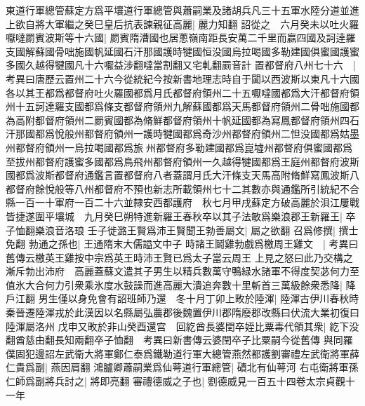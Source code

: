 東道行軍總管蘇定方爲平壤道行軍總管與蕭嗣業及諸胡兵凡三十五軍水陸分道並進上欲自將大軍繼之癸巳皇后抗表諫親征高麗|{
	麗力知翻}
詔從之　六月癸未以吐火羅嚈噠罽賓波斯等十六國|{
	罽賓隋漕國也居蔥嶺南距長安萬二千里而嬴四國及訶逹羅支國解蘇國骨咄施國帆延國石汗那國護時犍國恒没國烏拉喝國多勒建國俱蜜國護蜜多國久越得犍國凡十六嚈益涉翻噠當割翻又宅軋翻罽音計}
置都督府八州七十六　|{
	考異曰唐歷云置州二十六今從統紀今按新書地理志時自于闐以西波斯以東凡十六國各以其王都爲都督府吐火羅國都爲月氏都督府領州二十五嚈噠國都爲大汗都督府領州十五訶達羅支國都爲條支都督府領州九解蘇國都爲天馬都督府領州二骨咄施國都為高附都督府領州二罽賓國都為脩鮮都督府領州十帆延國都為寫鳳都督府領州四石汗那國都爲悅般州都督府領州一護時犍國都爲奇沙州都督府領州二怛没國都爲姑墨州都督府領州一烏拉喝國都爲旅州都督府多勒建國都爲崑墟州都督府俱蜜國都爲至拔州都督府護蜜多國都爲鳥飛州都督府領州一久越得犍國都爲王庭州都督府波斯國都爲波斯都督府通鑑言置都督府八者蓋謂月氏大汗條支天馬高附脩鮮寫鳳波斯八都督府餘悅般等八州都督府不預也新志所載領州七十二其數亦與通鑑所引統紀不合}
縣一百一十軍府一百二十六並隸安西都護府　秋七月甲戌蘇定方破高麗於浿江屢戰皆捷遂圍平壤城　九月癸巳朔特進新羅王春秋卒以其子法敏爲樂浪郡王新羅王|{
	卒子恤翻樂浪音洛琅}
壬子徙潞王賢爲沛王賢聞王勃善屬文|{
	屬之欲翻}
召爲修撰|{
	撰士免翻}
勃通之孫也|{
	王通隋末大儒謚文中子}
時諸王鬬雞勃戲爲檄周王雞文　|{
	考異曰舊傳云檄英王雞按中宗爲英王時沛王賢已爲太子當云周王}
上見之怒曰此乃交構之漸斥勃出沛府　高麗蓋蘇文遣其子男生以精兵數萬守鴨緑水諸軍不得度契苾何力至值氷大合何力引衆乘氷度水鼓譟而進高麗大潰追奔數十里斬首三萬級餘衆悉降|{
	降戶江翻}
男生僅以身免會有詔班師乃還　冬十月丁卯上畋於陸渾|{
	陸渾古伊川春秋時秦晉遷陸渾戎於此漢因以名縣屬弘農郡後魏置伊川郡隋廢郡改縣曰伏流大業初復曰陸渾屬洛州}
戊申又畋於非山癸酉還宫　回紇酋長婆閏卒姪比粟毒代領其衆|{
	紇下没翻酋慈由翻長知兩翻卒子恤翻　考異曰新書傳云婆閏卒子比粟嗣今從舊傳}
與同羅僕固犯邊詔左武衛大將軍鄭仁泰爲鐵勒道行軍大總管燕然都護劉審禮左武衛將軍薛仁貴爲副|{
	燕因肩翻}
鴻臚卿蕭嗣業爲仙萼道行軍總管|{
	磧北有仙萼河}
右屯衛將軍孫仁師爲副將兵討之|{
	將即亮翻}
審禮德威之子也|{
	劉德威見一百五十四卷太宗貞觀十一年}



